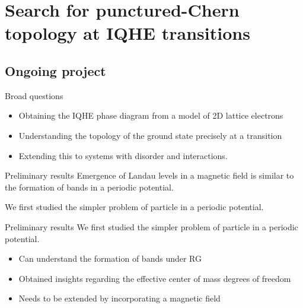 \documentclass[12pt,aspectratio=169]{beamer}
\begin{document}
\section{Search for punctured-Chern topology at IQHE transitions}
\subsection{Ongoing project}

\begin{frame}{Broad questions}

\vspace*{\fill}
\begin{minipage}{0.5\textwidth}
\begin{itemize}[<+->]
	\item Obtaining the \alert{IQHE phase diagram} from a model of 2D lattice electrons\\[10pt]
	\item Understanding the \alert{topology} of the ground state precisely at a transition\\[10pt]
	\item Extending this to systems with \alert{disorder} and interactions.
\end{itemize}
\end{minipage}
\hspace*{\fill}
\begin{minipage}{0.4\textwidth}
\end{minipage}

\vspace*{\fill}
\end{frame}

\begin{frame}{Preliminary results}
Emergence of \alert{Landau levels} in a magnetic field is similar to the formation of \alert{bands} in a periodic potential.

\vspace*{\fill}

\vspace*{\fill}
We first studied the simpler problem of \alert{particle in a periodic potential}.
\end{frame}

\begin{frame}{Preliminary results}
We first studied the simpler problem of \alert{particle in a periodic potential}.

\vspace*{\fill}

\vspace*{\fill}
	
\begin{itemize}
	\item Can understand the formation of bands under RG
	\item Obtained insights regarding the \alert{effective center of mass} degrees of freedom
	\item Needs to be extended by incorporating a \alert{magnetic field}
\end{itemize}
\end{frame}
\end{document}
